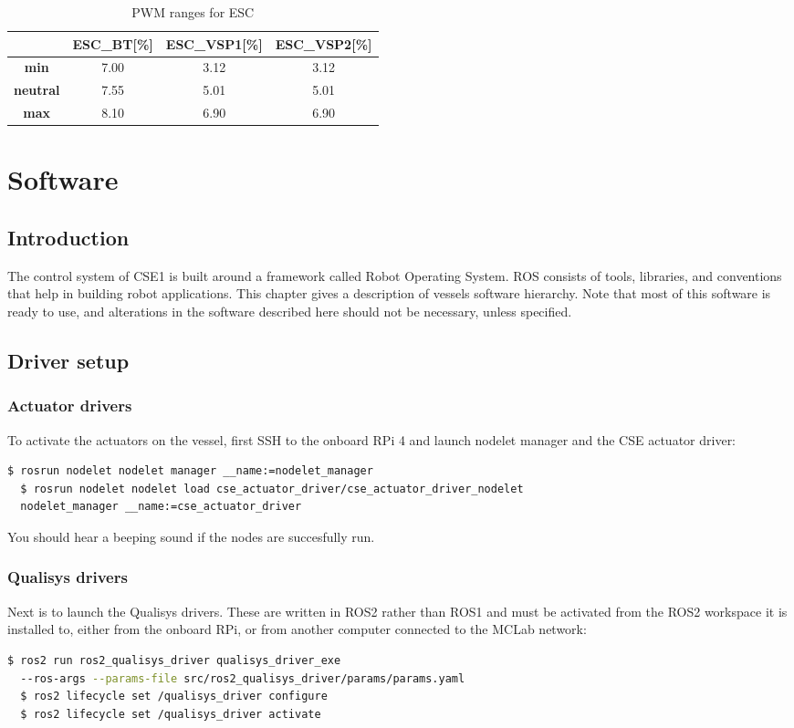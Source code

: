 \begin{table}[h!]
	\centering
	\caption{PWM ranges for ESC}
	\label{tab:pwm_range}
	\begin{tabular}{cccc}
		\hline
		& \textbf{ESC\_BT}[\%] & \textbf{ESC\_VSP1}[\%] & \textbf{ESC\_VSP2}[\%]\\ \hline
		\textbf{min} & 7.00 & 3.12 & 3.12\\
		\textbf{neutral} & 7.55 & 5.01 & 5.01\\
		\textbf{max} & 8.10 & 6.90 & 6.90\\ \hline
	\end{tabular}
\end{table}

\chapter{Software}
\section{Introduction}

The control system of CSE1 is built around a framework called Robot Operating System. ROS consists of tools, libraries, and conventions that help in building robot applications. This chapter gives a description of vessels software hierarchy. Note that most of this software is ready to use, and alterations in the software described here should not be necessary, unless specified.


\section{Driver setup}

\subsection{Actuator drivers}
To activate the actuators on the vessel, first SSH to the onboard RPi 4 and launch nodelet manager and the CSE actuator driver:
\begin{lstlisting}[language=bash,basicstyle=\mlttfamily, breaklines=true]
  $ rosrun nodelet nodelet manager __name:=nodelet_manager
  $ rosrun nodelet nodelet load cse_actuator_driver/cse_actuator_driver_nodelet  
  nodelet_manager __name:=cse_actuator_driver
\end{lstlisting}
You should hear a beeping sound if the nodes are succesfully run. 
\subsection{Qualisys drivers}
Next is to launch the Qualisys drivers. These are written in ROS2 rather than ROS1 and  must be activated from the ROS2 workspace it is installed to, either from the onboard RPi, or from another computer connected to the MCLab network: 
\begin{lstlisting}[language=bash,basicstyle=\mlttfamily, breaklines=true]
  $ ros2 run ros2_qualisys_driver qualisys_driver_exe 
  --ros-args --params-file src/ros2_qualisys_driver/params/params.yaml
  $ ros2 lifecycle set /qualisys_driver configure
  $ ros2 lifecycle set /qualisys_driver activate
\end{lstlisting}

